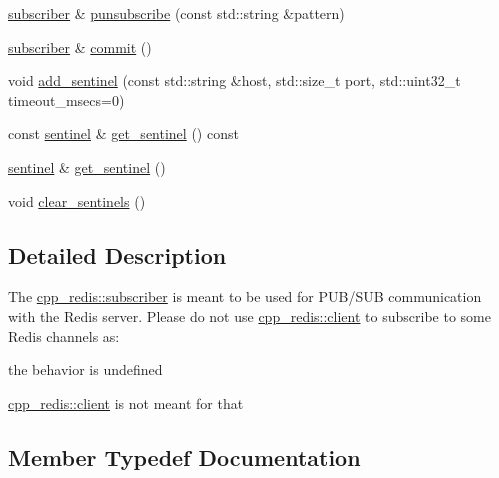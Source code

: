 \begin{DoxyCompactItemize}
\mbox{\hyperlink{classcpp__redis_1_1subscriber}{subscriber}} \& \mbox{\hyperlink{classcpp__redis_1_1subscriber_a26edc7dcf87ddc8734fac04878ca307a}{punsubscribe}} (const std\+::string \&pattern)
\item 
\mbox{\hyperlink{classcpp__redis_1_1subscriber}{subscriber}} \& \mbox{\hyperlink{classcpp__redis_1_1subscriber_af78a5542315daac42998809eeec30eef}{commit}} ()
\item 
void \mbox{\hyperlink{classcpp__redis_1_1subscriber_a2faf9e9cc9c95e3c0fed148355af84f1}{add\+\_\+sentinel}} (const std\+::string \&host, std\+::size\+\_\+t port, std\+::uint32\+\_\+t timeout\+\_\+msecs=0)
\item 
const \mbox{\hyperlink{classcpp__redis_1_1sentinel}{sentinel}} \& \mbox{\hyperlink{classcpp__redis_1_1subscriber_a0a6212dfba0513508fdc6377f83a0048}{get\+\_\+sentinel}} () const
\item 
\mbox{\hyperlink{classcpp__redis_1_1sentinel}{sentinel}} \& \mbox{\hyperlink{classcpp__redis_1_1subscriber_a4a77354e12a6ef19cad7b0f55b62033c}{get\+\_\+sentinel}} ()
\item 
void \mbox{\hyperlink{classcpp__redis_1_1subscriber_a3f8119bc43a67f8e22369aad529444ba}{clear\+\_\+sentinels}} ()
\end{DoxyCompactItemize}


\subsection{Detailed Description}
The \mbox{\hyperlink{classcpp__redis_1_1subscriber}{cpp\+\_\+redis\+::subscriber}} is meant to be used for P\+U\+B/\+S\+UB communication with the Redis server. Please do not use \mbox{\hyperlink{classcpp__redis_1_1client}{cpp\+\_\+redis\+::client}} to subscribe to some Redis channels as\+:
\begin{DoxyItemize}
\item the behavior is undefined
\item \mbox{\hyperlink{classcpp__redis_1_1client}{cpp\+\_\+redis\+::client}} is not meant for that 
\end{DoxyItemize}

\subsection{Member Typedef Documentation}
\mbox{\label{classcpp__redis_1_1subscriber_a19ea39dfabeb19937a9ce4c8d21781b4}} 
